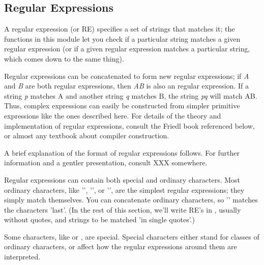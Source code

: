 \subsection{Regular Expressions}

A regular expression (or RE) specifies a set of strings that matches
it; the functions in this module let you check if a particular string
matches a given regular expression (or if a given regular expression
matches a particular string, which comes down to the same thing).

Regular expressions can be concatenated to form new regular
expressions; if \emph{A} and \emph{B} are both regular expressions,
then \emph{AB} is also an regular expression.  If a string \emph{p}
matches A and another string \emph{q} matches B, the string \emph{pq}
will match AB.  Thus, complex expressions can easily be constructed
from simpler primitive expressions like the ones described here.  For
details of the theory and implementation of regular expressions,
consult the Friedl book referenced below, or almost any textbook about
compiler construction.

A brief explanation of the format of regular expressions follows.  For
further information and a gentler presentation, consult XXX somewhere.

Regular expressions can contain both special and ordinary characters.
Most ordinary characters, like '', '', or '',
are the simplest regular expressions; they simply match themselves.  
You can concatenate ordinary characters, so '' matches the
characters 'last'.  (In the rest of this section, we'll write RE's in
, usually without quotes, and strings to be
matched 'in single quotes'.)

Some characters, like \code{|} or \code{(}, are special.  Special
characters either stand for classes of ordinary characters, or affect
how the regular expressions around them are interpreted.

